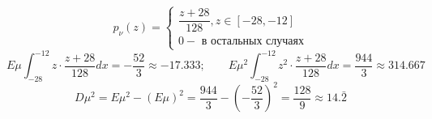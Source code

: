 \begin{enumerate}
\begin{figure}[H]
	\end{figure}
	\[
	p_{\nu} (z) =
	\begin{cases}
		\dfrac{z + 28}{128}, z \in [-28,-12] \\
		0 - \text{ в остальных случаях}
	\end{cases}
	\]
	\[ E\mu \int_{-28}^{-12} z \cdot \frac{z + 28}{128} dx = -\frac{52}{3} \approx -17.333; ~~~~~~~~~ E\mu^2 \int_{-28}^{-12} z^2 \cdot \frac{z + 28}{128} dx = \frac{944}{3} \approx 314.667 \]
	\[ D\mu^2 = E\mu^2 - (E\mu)^2 = \frac{944}{3} - \left( -\frac{52}{3} \right)^2 = \frac{128}{9} \approx 14.\bar{2} \]
	
\end{enumerate}

 